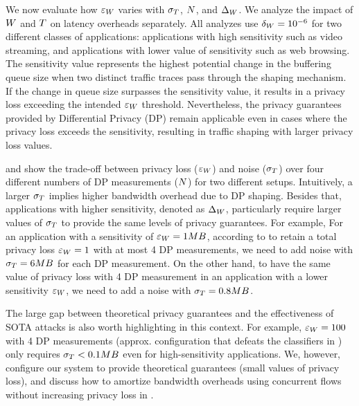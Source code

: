 We now  evaluate how $\varepsilon_{W}$ varies with $\sigma_T$, $N$, and $\Delta_{W}$.
We analyze the impact of $W$ and $T$ on latency overheads separately.
All analyzes use $\delta_W = 10^{-6}$ for two different classes of applications: applications with high sensitivity such as video streaming, and applications with lower value of sensitivity such as web browsing.
The sensitivity value represents the highest potential change in the buffering queue size when two distinct traffic traces pass through the shaping mechanism.
If the change in queue size surpasses the sensitivity value, it results in a privacy loss exceeding the intended $\varepsilon_{W}$ threshold.
Nevertheless, the privacy guarantees provided by Differential Privacy (DP) remain applicable even in cases where the privacy loss exceeds the sensitivity, resulting in traffic shaping with larger privacy loss values.


 and  show the trade-off between privacy loss ($\varepsilon_{W}$) and noise ($\sigma_T$) over four different numbers of DP measurements ($N$) for two different setups.
Intuitively, a larger $\sigma_T$ implies higher bandwidth overhead due to DP shaping.
Besides that, applications with higher sensitivity, denoted as $\Delta_{W}$, particularly require larger values of $\sigma_T$ to provide the same levels of privacy guarantees.
For example, For an application with a sensitivity of $\varepsilon_{W}=1MB$, according to  to retain a total privacy loss $\varepsilon_{W} = 1$ with at most 4 DP measurements, we need to add noise with $\sigma_T = 6 MB$ for each DP measurement.
On the other hand, to have the same value of privacy loss with 4 DP measurement in an application with a lower sensitivity $\varepsilon_{W}$, we need to add a noise with $\sigma_T = 0.8 MB$.

The large gap between theoretical privacy guarantees and the effectiveness of SOTA attacks is also worth highlighting in this context.
For example, $\varepsilon_{W} = 100$ with 4 DP measurements (approx. configuration that defeats the classifiers in ) only requires $\sigma_T < 0.1 MB$ even for high-sensitivity applications.
We, however, configure our system to provide theoretical guarantees (\ie small values of privacy loss), and discuss how to amortize bandwidth overheads using concurrent flows without increasing privacy loss in .

